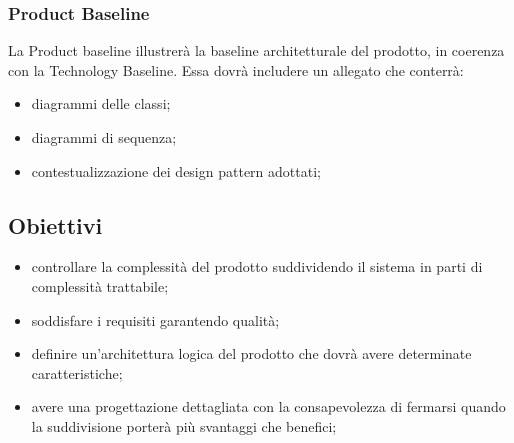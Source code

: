 	\subsubsection{Product Baseline}
	La Product baseline illustrerà la baseline architetturale del prodotto, in coerenza con la Technology Baseline.
	Essa dovrà includere un allegato che conterrà:
	\begin{itemize}
		\item	diagrammi delle classi;
		\item	diagrammi di sequenza;
		\item	contestualizzazione dei design pattern adottati;	
	\end{itemize}

\subsection{Obiettivi}
\begin{itemize}
	\item controllare la complessità del prodotto suddividendo il sistema in parti di complessità trattabile;
	\item soddisfare i requisiti garantendo qualità;
	\item definire un’architettura logica del prodotto che dovrà avere determinate caratteristiche;
	\item avere una progettazione dettagliata con la consapevolezza di fermarsi quando la suddivisione porterà più svantaggi che benefici;
\end{itemize}
